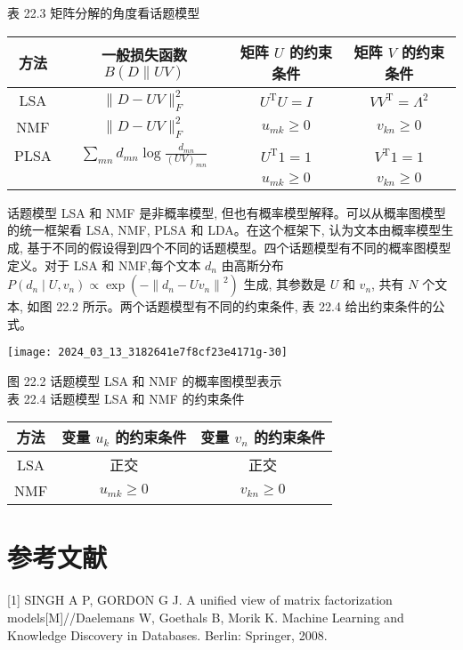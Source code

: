 \documentclass[10pt]{article}
\begin{document}
\begin{CJK*}{UTF8}{bsmi}
表 22.3 矩阵分解的角度看话题模型

\begin{center}
\begin{tabular}{cccc}
\hline
方法 & 一般损失函数 $B(D \| U V)$ & 矩阵 $U$ 的约束条件 & 矩阵 $V$ 的约束条件 \\
\hline
LSA & $\|D-U V\|_{F}^{2}$ & $U^{\mathrm{T}} U=I$ & $V V^{\mathrm{T}}=\Lambda^{2}$ \\
NMF & $\|D-U V\|_{F}^{2}$ & $u_{m k} \geqslant 0$ & $v_{k n} \geqslant 0$ \\
PLSA & $\sum_{m n} d_{m n} \log \frac{d_{m n}}{(U V)_{m n}}$ & $U^{\mathrm{T}} 1=1$ & $V^{\mathrm{T}} 1=1$ \\
 &  & $u_{m k} \geqslant 0$ & $v_{k n} \geqslant 0$ \\
\hline
\end{tabular}
\end{center}

话题模型 LSA 和 NMF 是非概率模型, 但也有概率模型解释。可以从概率图模型的统一框架看 LSA, NMF, PLSA 和 LDA。在这个框架下, 认为文本由概率模型生成, 基于不同的假设得到四个不同的话题模型。四个话题模型有不同的概率图模型定义。对于 LSA 和 NMF,每个文本 $d_{n}$ 由高斯分布 $P\left(d_{n} \mid U, v_{n}\right) \propto \exp \left(-\left\|d_{n}-U v_{n}\right\|^{2}\right)$ 生成, 其参数是 $U$ 和 $v_{n}$, 共有 $N$ 个文本, 如图 22.2 所示。两个话题模型有不同的约束条件, 表 22.4 给出约束条件的公式。

\begin{center}
\texttt{[image: 2024\_03\_13\_3182641e7f8cf23e4171g-30]}
\end{center}

图 22.2 话题模型 LSA 和 NMF 的概率图模型表示\\
表 22.4 话题模型 LSA 和 NMF 的约束条件

\begin{center}
\begin{tabular}{ccc}
\hline
方法 & 变量 $u_{k}$ 的约束条件 & 变量 $v_{n}$ 的约束条件 \\
\hline
LSA & 正交 & 正交 \\
NMF & $u_{m k} \geqslant 0$ & $v_{k n} \geqslant 0$ \\
\hline
\end{tabular}
\end{center}

\section*{参考文献}
[1] SINGH A P, GORDON G J. A unified view of matrix factorization models[M]//Daelemans W, Goethals B, Morik K. Machine Learning and Knowledge Discovery in Databases. Berlin: Springer, 2008.


\end{CJK*}
\end{document}
